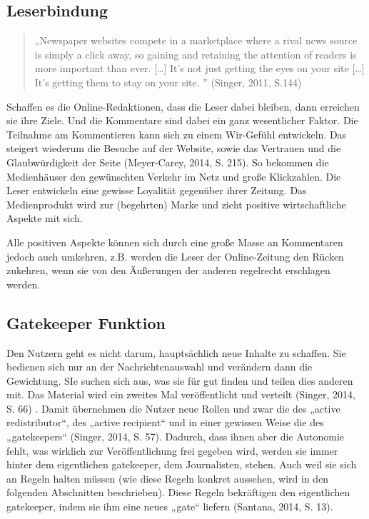 \subsection{Leserbindung}

\begin{quote}
„Newspaper websites compete in a marketplace where a rival news source is simply
a click away, so gaining and retaining the attention of readers is more
important than ever. [\ldots] It’s not just getting the eyes on your site
[\ldots] It’s getting them to stay on your site. ” (Singer, 2011, S.144)
\end{quote}

Schaffen es die Online-Redaktionen, dass die Leser dabei bleiben, dann erreichen
sie ihre Ziele. Und die Kommentare sind dabei ein ganz wesentlicher Faktor. Die
Teilnahme am Kommentieren kann sich zu einem Wir-Gefühl entwickeln. Das steigert
wiederum die Besuche auf der Website, sowie das Vertrauen und die
Glaubwürdigkeit der Seite (Meyer-Carey, 2014, S. 215). So bekommen die
Medienhäuser den gewünschten Verkehr im Netz und große Klickzahlen. Die Leser
entwickeln eine gewisse Loyalität gegenüber ihrer Zeitung. Das Medienprodukt
wird zur (begehrten) Marke und zieht positive wirtschaftliche Aspekte mit sich.

Alle positiven Aspekte können sich durch eine große Masse an Kommentaren jedoch
auch umkehren, z.B. werden die Leser der Online-Zeitung den Rücken zukehren,
wenn sie von den Äußerungen der anderen regelrecht erschlagen werden.


\subsection{Gatekeeper Funktion}


Den Nutzern geht es nicht darum, hauptsächlich neue Inhalte zu schaffen. Sie
bedienen sich nur an der Nachrichtenauswahl und verändern dann die Gewichtung. 
SIe suchen sich aus, was sie für gut finden und teilen dies anderen mit. Das Material wird
ein zweites Mal veröffentlicht und verteilt (Singer, 2014, S. 66) .
Damit übernehmen die Nutzer neue Rollen und zwar die des „active redistributor“, des
„active recipient“ und in einer gewissen Weise die des „gatekeepers“ (Singer,
2014, S. 57). Dadurch, dass ihnen aber die Autonomie fehlt, was wirklich zur
Veröffentlichung frei gegeben wird, werden sie immer hinter dem eigentlichen
gatekeeper, dem Journalisten, stehen. Auch weil sie sich an Regeln halten müssen
(wie diese Regeln konkret aussehen, wird in den folgenden Abschnitten
beschrieben). Diese Regeln bekräftigen den eigentlichen gatekeeper, indem sie
ihm eine neues „gate“ liefern (Santana, 2014, S. 13).

